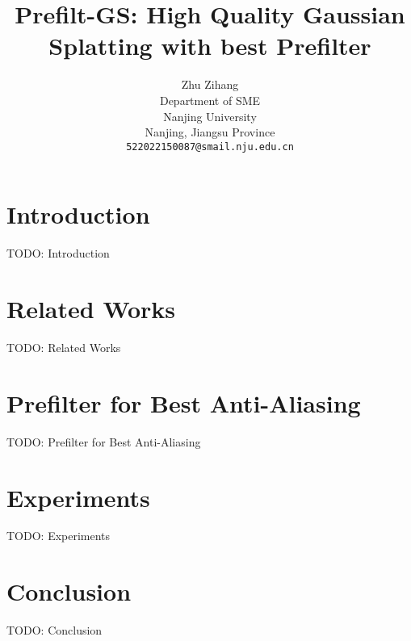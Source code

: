 \documentclass{arxiv_art/arxiv_art}
\title{Prefilt-GS: High Quality Gaussian Splatting with best Prefilter}
\author{
    \hspace{1mm}Zhu Zihang \\
    Department of SME \\
    Nanjing University\\
    Nanjing, Jiangsu Province \\
    \texttt{522022150087@smail.nju.edu.cn}
}
\begin{document}
\maketitle 
\begin{abstract}

\end{abstract}

\section{Introduction}
\label{sec:intro}
TODO: Introduction

\section{Related Works}
\label{sec:related}
TODO: Related Works

\section{Prefilter for Best Anti-Aliasing}
\label{sec:principle}
TODO: Prefilter for Best Anti-Aliasing

\section{Experiments}
\label{sec:experiments}
TODO: Experiments

\section{Conclusion}
\label{sec:conclusion}
TODO: Conclusion
\end{document}
